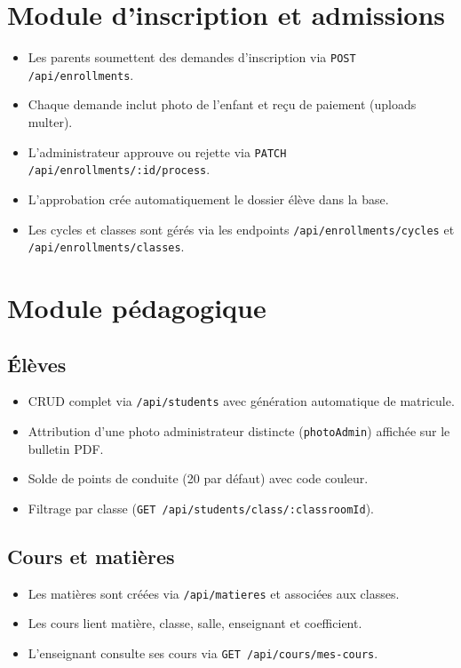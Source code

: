 \documentclass[12pt,a4paper]{report}
\begin{document}
\section{Module d'inscription et admissions}
\begin{itemize}[leftmargin=*]
    \item Les parents soumettent des demandes d'inscription via \texttt{POST /api/enrollments}.
    \item Chaque demande inclut photo de l'enfant et reçu de paiement (uploads multer).
    \item L'administrateur approuve ou rejette via \texttt{PATCH /api/enrollments/:id/process}.
    \item L'approbation crée automatiquement le dossier élève dans la base.
    \item Les cycles et classes sont gérés via les endpoints \texttt{/api/enrollments/cycles} et \texttt{/api/enrollments/classes}.
\end{itemize}
 
\section{Module pédagogique}
 
\subsection*{Élèves}
\begin{itemize}[leftmargin=*]
    \item CRUD complet via \texttt{/api/students} avec génération automatique de matricule.
    \item Attribution d'une photo administrateur distincte (\texttt{photoAdmin}) affichée sur le bulletin PDF.
    \item Solde de points de conduite (20 par défaut) avec code couleur.
    \item Filtrage par classe (\texttt{GET /api/students/class/:classroomId}).
\end{itemize}
 
\subsection*{Cours et matières}
\begin{itemize}[leftmargin=*]
    \item Les matières sont créées via \texttt{/api/matieres} et associées aux classes.
    \item Les cours lient matière, classe, salle, enseignant et coefficient.
    \item L'enseignant consulte ses cours via \texttt{GET /api/cours/mes-cours}.
\end{itemize}
 
\end{document}
